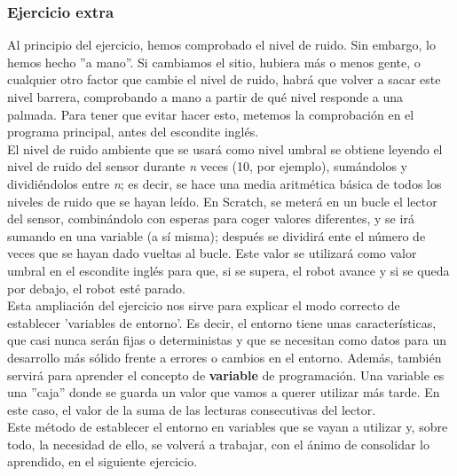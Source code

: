 \subsubsection{Ejercicio extra}
Al principio del ejercicio, hemos comprobado el nivel de ruido. Sin embargo, lo hemos hecho ''a mano''. Si cambiamos el sitio, hubiera más o menos gente, o cualquier otro factor que cambie el nivel de ruido, habrá que volver a sacar este nivel barrera, comprobando a mano a partir de qué nivel responde a una palmada. Para tener que evitar hacer esto, metemos la comprobación en el programa principal, antes del escondite inglés. \\
El nivel de ruido ambiente que se usará como nivel umbral se obtiene leyendo el nivel de ruido del sensor durante \textit{n} veces (10, por ejemplo), sumándolos y dividiéndolos entre \textit{n}; es decir, se hace una media aritmética básica de todos los niveles de ruido que se hayan leído. En Scratch, se meterá en un bucle el lector del sensor, combinándolo con esperas para coger valores diferentes, y se irá sumando en una variable (a sí misma); después se dividirá ente el número de veces que se hayan dado vueltas al bucle. Este valor se utilizará como valor umbral en el escondite inglés para que, si se supera, el robot avance y si se queda por debajo, el robot esté parado.\\
Esta ampliación del ejercicio nos sirve para explicar el modo correcto de establecer 'variables de entorno'. Es decir, el entorno tiene unas características, que casi nunca serán fijas o deterministas y que se necesitan como datos para un desarrollo más sólido frente a errores o cambios en el entorno. Además, también servirá para aprender el concepto de \textbf{variable} de programación. Una variable es una ''caja'' donde se guarda un valor que vamos a querer utilizar más tarde. En este caso, el valor de la suma de las lecturas consecutivas del lector.\\
Este método de establecer el entorno en variables que se vayan a utilizar y, sobre todo, la necesidad de ello, se volverá a trabajar, con el ánimo de consolidar lo aprendido, en el siguiente ejercicio. 

